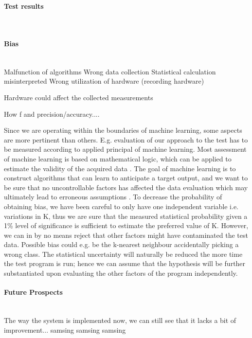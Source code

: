 \paragraph{Test results} \hspace{0pt} \\


\paragraph{Bias} \hspace{0pt} \\
Malfunction of algorithms
Wrong data collection
Statistical calculation misinterpreted
Wrong utilization of hardware (recording hardware)

Hardware could affect the collected measurements

How f and precision/accuracy....
 


Since we are operating within the boundaries of machine learning, some aspects are more pertinent than others. E.g. evaluation of our approach to the test has to be measured according to applied principal of machine learning. Most assessment of machine learning is based on mathematical logic, which can be applied to estimate the validity of the acquired data \citep{Gordon1995}. The goal of machine learning is to construct algorithms that can learn to anticipate a target output, and we want to be sure that no uncontrollable factors has affected the data evaluation which may ultimately lead to erroneous assumptions \citep{Gordon1995}. To decrease the probability of obtaining bias, we have been careful to only have one independent variable i.e. variations in K, thus we are sure that the measured statistical probability given a 1\% level of significance is sufficient to estimate the preferred value of K. However, we can in by no means reject that other factors might have contaminated the test data. Possible bias could e.g. be the k-nearest neighbour accidentally picking a wrong class. The statistical uncertainty will naturally be reduced the more time the test program is run; hence we can assume that the hypothesis will be further substantiated upon evaluating the other factors of the program independently.\\
\paragraph{Future Prospects} \hspace{0pt} \\
The way the system is implemented now, we can still see that it lacks a bit of improvement... samsing samsing samsing

